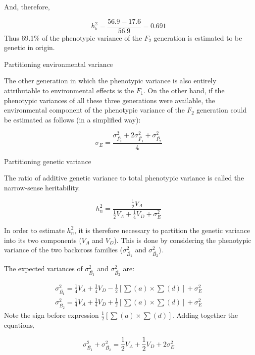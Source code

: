 \documentclass[11pt,dvipsnames,ignorenonframetext,aspectratio=169]{beamer}
\begin{document}
\begin{frame}{}
\protect\hypertarget{section-11}{}

And, therefore,

\[
h_b^2=\frac{56.9-17.6}{56.9} = 0.691
\] Thus 69.1\% of the phenotypic variance of the \(F_2\) generation is
estimated to be genetic in origin.

\end{frame}

\begin{frame}{Partitioning environmental variance}
\protect\hypertarget{partitioning-environmental-variance}{}

The other generation in which the phenotypic variance is also entirely
attributable to environmental effects is the \(F_1\). On the other hand,
if the phenotypic variances of all these three generations were
available, the environmental component of the phenotypic variance of the
\(F_2\) generation could be estimated as follows (in a simplified way):

\[
\sigma_E = \frac{\sigma_{\bar{P_1}}^2 + 2\sigma_{\bar{F_1}}^2 + \sigma_{\bar{P_2}}^2}{4}
\tag{iv}
\]

\end{frame}

\begin{frame}{Partitioning genetic variance}
\protect\hypertarget{partitioning-genetic-variance}{}

The ratio of additive genetic variance to total phenotypic variance is
called the narrow-sense heritability.

\[
h_n^2 = \frac{\frac{1}{2}V_A}{\frac{1}{2}V_A + \frac{1}{4}V_D + \sigma_E^2}
\tag{v}
\]

In order to estimate \(h_n^2\), it is therefore necessary to partition
the genetic variance into its two components (\(V_A\) and \(V_D\)). This
is done by considering the phenotypic variance of the two backcross
families (\(\sigma_{\bar{B_1}}^2\) and \(\sigma_{\bar{B_2}}^2\)).

\end{frame}

\begin{frame}{}
\protect\hypertarget{section-12}{}

The expected variances of \(\sigma_{\bar{B_1}}^2\) and
\(\sigma_{\bar{B_2}}^2\) are:

\[
\begin{aligned}
\sigma_{\bar{B_1}}^2 = \frac{1}{4}V_A + \frac{1}{4}V_D - \frac{1}{2}\left[\sum(a)\times\sum(d)\right] + \sigma_E^2 \\
\sigma_{\bar{B_2}}^2 = \frac{1}{4}V_A + \frac{1}{4}V_D + \frac{1}{2}\left[\sum(a)\times\sum(d)\right] + \sigma_E^2
\end{aligned}
\] Note the sign before expression
\(\frac{1}{2}\left[\sum(a)\times\sum(d)\right]\). Adding together the
equations,

\[
\sigma_{\bar{B_1}}^2 + \sigma_{\bar{B_2}}^2 = \frac{1}{2}V_A + \frac{1}{2}V_D + 2\sigma_E^2
\tag{vi}
\]

\end{frame}
\end{document}
